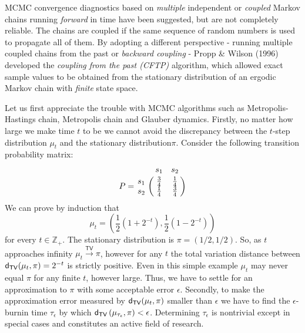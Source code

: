 MCMC convergence diagnostics based on {\it multiple} independent or {\it coupled} Markov chains running {\it forward} in time have been suggested, but are not completely reliable. The chains are coupled if the same sequence of random numbers is used to propagate all of them. By adopting a different perspective - running multiple coupled chains from the past or {\it backward coupling} - Propp \& Wilson (1996) developed the {\it coupling from the past (CFTP)} algorithm, which allowed exact sample values to be obtained from the stationary distribution of an ergodic Markov chain with {\it finite} state space.

Let us first appreciate the trouble with MCMC algorithms such as Metropolis-Hastings chain, Metropolis chain and Glauber dynamics.  
Firstly, no matter how large we make time $t$ to be we cannot avoid the discrepancy between the $t$-step distribution $\mu_t$ and the stationary distribution$\pi$.  
Consider the following transition probability matrix:
\[
P = 
\bordermatrix{~ & s_1 & s_2 \cr
s_1 & \frac{3}{4} & \frac{1}{4}  \cr
s_2 & \frac{1}{4} & \frac{3}{4} }
\]
We can prove by induction that 
$$\mu_t=\left(\frac{1}{2}\left(1+2^{-t}\right), \frac{1}{2}\left(1-2^{-t}\right)\right)$$
for every $t \in \mathbb{Z}_+$.  
The stationary distribution is $\pi=(1/2,1/2)$.  
So, as $t$ approaches infinity $\mu_t \overset{\mathsf{TV}}{\longrightarrow} \pi$, however for any $t$ the total variation distance between $\mathsf{d_{TV}}(\mu_t,\pi) = 2^{-t}$ is strictly positive.  
Even in this simple example $\mu_t$ may never equal $\pi$ for any finite $t$, however large.
Thus, we have to settle for an approximation to $\pi$ with some acceptable error $\epsilon$.  
Secondly, to make the approximation error measured by $\mathsf{d_{TV}}(\mu_t,\pi)$ smaller than $\epsilon$ we have to find the $\epsilon$-burnin time $\tau_{\epsilon}$ by which $\mathsf{d_{TV}} \left(\mu_{\tau_{\epsilon}},\pi\right) < \epsilon$.  
Determining $\tau_{\epsilon}$ is nontrivial except in special cases and constitutes an active field of research.  





